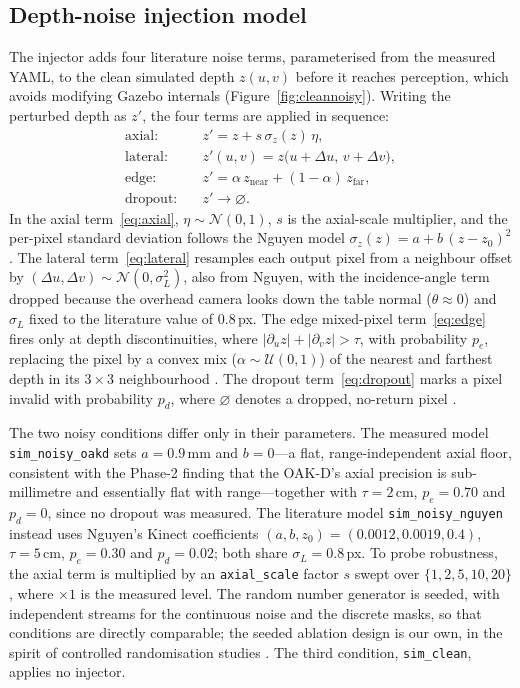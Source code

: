 \subsection{Depth-noise injection model}\label{sec:methods-inject}
The injector adds four literature noise terms, parameterised from the measured YAML, to
the clean simulated depth $z(u,v)$ before it reaches perception, which avoids modifying
Gazebo internals (Figure~\ref{fig:cleannoisy}). Writing the perturbed depth as $z'$, the
four terms are applied in sequence:
\begin{align}
\text{axial:}   &\quad z' = z + s\,\sigma_z(z)\,\eta, \label{eq:axial}\\
\text{lateral:} &\quad z'(u,v) = z\big(u+\Delta u,\,v+\Delta v\big), \label{eq:lateral}\\
\text{edge:}    &\quad z' = \alpha\,z_{\text{near}} + (1-\alpha)\,z_{\text{far}}, \label{eq:edge}\\
\text{dropout:} &\quad z' \to \varnothing. \label{eq:dropout}
\end{align}
In the axial term~\eqref{eq:axial}, $\eta\sim\mathcal{N}(0,1)$, $s$ is the axial-scale
multiplier, and the per-pixel standard deviation follows the Nguyen model
$\sigma_z(z)=a+b\,(z-z_0)^2$ \cite{nguyen2012modeling}. The lateral term~\eqref{eq:lateral}
resamples each output pixel from a neighbour offset by
$(\Delta u,\Delta v)\sim\mathcal{N}(0,\sigma_L^2)$, also from Nguyen, with the
incidence-angle term dropped because the overhead camera looks down the table normal
($\theta\approx0$) and $\sigma_L$ fixed to the literature value of $0.8$\,px. The edge
mixed-pixel term~\eqref{eq:edge} fires only at depth discontinuities, where
$\lvert\partial_u z\rvert+\lvert\partial_v z\rvert>\tau$, with probability $p_e$, replacing
the pixel by a convex mix ($\alpha\sim\mathcal{U}(0,1)$) of the nearest and farthest depth
in its $3\times3$ neighbourhood \cite{foix2011lockin,sarbolandi2015kinect}. The dropout
term~\eqref{eq:dropout} marks a pixel invalid with probability $p_d$, where $\varnothing$
denotes a dropped, no-return pixel \cite{sarbolandi2015kinect}.

The two noisy conditions differ only in their parameters. The measured model
\texttt{sim\_noisy\_oakd} sets $a=0.9$\,mm and $b=0$---a flat, range-independent axial
floor, consistent with the Phase-2 finding that the OAK-D's axial precision is
sub-millimetre and essentially flat with range---together with $\tau=2$\,cm, $p_e=0.70$ and
$p_d=0$, since no dropout was measured. The literature model \texttt{sim\_noisy\_nguyen}
instead uses Nguyen's Kinect coefficients $(a,b,z_0)=(0.0012,0.0019,0.4)$, $\tau=5$\,cm,
$p_e=0.30$ and $p_d=0.02$; both share $\sigma_L=0.8$\,px. To probe robustness, the axial
term is multiplied by an \texttt{axial\_scale} factor $s$ swept over $\{1,2,5,10,20\}$,
where $\times1$ is the measured level. The random number generator is seeded, with
independent streams for the continuous noise and the discrete masks, so that conditions are
directly comparable; the seeded ablation design is our own, in the spirit of controlled
randomisation studies \cite{tobin2017domain}. The third condition, \texttt{sim\_clean},
applies no injector.

